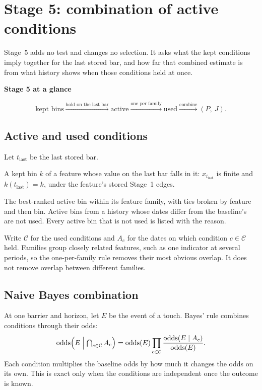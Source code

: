 \documentclass[11pt]{article}
\newenvironment{keyconcept}[1]{%
  \par\addvspace{8pt}\begin{lrbox}{\conceptbox}%
  \begin{minipage}{\dimexpr\linewidth-24pt\relax}%
  \setlength{\parindent}{0pt}%
  {\normalsize\bfseries\color{ConceptInk}#1\par}\large
}{%
  \end{minipage}\end{lrbox}%
  \noindent{\setlength{\fboxsep}{12pt}%
  \colorbox{ConceptPaper}{\usebox{\conceptbox}}}\par\addvspace{8pt}}
\begin{document}
\section{Stage 5: combination of active conditions}\label{sec:forecast}

Stage~5 adds no test and changes no selection. It asks what the kept
conditions imply together for the last stored bar, and how far that combined
estimate is from what history shows when those conditions held at once.

\begin{keyconcept}{Stage 5 at a glance}
\normalsize
\[
 \text{kept bins}
 \xrightarrow{\text{hold on the last bar}}
 \text{active}
 \xrightarrow{\text{one per family}}
 \text{used}
 \xrightarrow{\text{combine}}
 (P,\ J).
\]
\end{keyconcept}

\subsection{Active and used conditions}

Let $t_{\mathrm{last}}$ be the last stored bar.
\begin{description}[font=\normalfont\large\bfseries\color{ConceptInk}]
 \item[Active bin] A kept bin $k$ of a feature whose value on the last bar
       falls in it: $x_{t_{\mathrm{last}}}$ is finite and
       $k(t_{\mathrm{last}})=k$, under the feature's stored
       Stage~1 edges.
 \item[Used condition] The best-ranked active bin within its feature family,
       with ties broken by feature and then bin. Active bins from a history
       whose dates differ from the baseline's are not used. Every active bin
       that is not used is listed with the reason.
\end{description}
Write $\mathcal C$ for the used conditions and $A_c$ for the dates on which
condition $c\in\mathcal C$ held.
Families group closely related features, such as one indicator at several
periods, so the one-per-family rule removes their most obvious overlap. It
does not remove overlap between different families.

\subsection{Naive Bayes combination}

At one barrier and horizon, let $E$ be the event of a touch. Bayes' rule
combines conditions through their odds:
\[
 \operatorname{odds}\Bigl(E\Bigm|{\textstyle\bigcap_{c\in\mathcal C}A_c}\Bigr)
 =\operatorname{odds}(E)
  \prod_{c\in\mathcal C}\frac{\operatorname{odds}(E\mid A_c)}{\operatorname{odds}(E)}.
\]
Each condition multiplies the baseline odds by how much it changes the odds
on its own. This is exact only when the conditions are independent once the
outcome is known.
\end{document}
